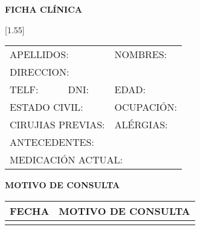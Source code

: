 \documentclass[10pt,a4paper]{article}
\begin{document}
\begin{center}
\LARGE{\textbf{FICHA CL\'INICA}}
\end{center}
\scalebox{1.40}[1.55]{
\begin{tabular}{p{2.8cm}p{2.8cm}p{6.5cm}}
\multicolumn{2}{p{6cm}}{\scriptsize{APELLIDOS: }} & \scriptsize{NOMBRES: } \\
\multicolumn{3}{p{13cm}}{\scriptsize{DIRECCION:}} \\
\scriptsize{TELF:} & \scriptsize{DNI:} & \scriptsize{EDAD:} \\
\multicolumn{2}{p{6cm}}{\scriptsize{ESTADO CIVIL:}} & \scriptsize{OCUPACI\'ON:} \\
\multicolumn{2}{p{6 cm}}{\scriptsize{CIRUJIAS PREVIAS:}} & \scriptsize{AL\'ERGIAS:} \\
\multicolumn{3}{p{13 cm}}{\scriptsize{ANTECEDENTES:}} \\
\multicolumn{3}{p{13 cm}}{\scriptsize{MEDICACI\'ON ACTUAL:}} \\
\end{tabular}}
\vspace{0.3cm}
\begin{center}
\LARGE{\textbf{MOTIVO DE CONSULTA}}
\end{center}
\begin{center}
\begin{longtable}{ p{2cm}| p{14.5cm}}
\hline
\endfirsthead
\textbf{FECHA} & \textbf{MOTIVO DE CONSULTA}\\\hline
\endhead
\endfoot
\endlastfoot
\end{longtable}
\end{center}
\end{document}
